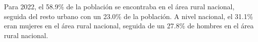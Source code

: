 Para 2022, el 58.9\% de la población se encontraba en el área rural nacional, seguida del resto urbano con un 23.0\% de la población. A nivel nacional, el 31.1\% eran mujeres en el área rural nacional, seguida de un 27.8\% de hombres en el área rural nacional. 